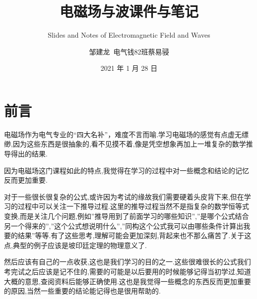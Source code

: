 \documentclass[
  10pt,
  twoside,
  openany,
  b5paper, %
  colorscheme = basic, %
]{qyxf-book}
\title{电磁场与波课件与笔记}
\subtitle{Slides and Notes of Electromagnetic Field and Waves}  %
\author{邹建龙\ 电气钱82班蔡易骎}
\date{2021 年 1 月 28 日}
\begin{document}
\maketitle

\chapter*{前言}
\thispagestyle{empty}

电磁场作为电气专业的“四大名补”，难度不言而喻.学习电磁场的感觉有点虚无缥缈,因为这些东西是很抽象的,看不见摸不着,像是凭空想象再加上一堆复杂的数学推导得出的结果.

因为电磁场这门课程如此的特点,我觉得在学习的过程中对一些概念和结论的记忆反而更加重要.

对于一些很长很复杂的公式,或许因为考试的缘故我们需要硬着头皮背下来,但在学习的过程中可以关注一下推导过程.这里的推导过程当然不是指复杂的数学恒等式变换,而是关注几个问题,例如”推导用到了前面学习的哪些知识”,”是哪个公式结合另一个得来的”,”这个公式想说明什么”,”同构这个公式我可以由哪些条件计算出我要的结果”等等.有了这些思考,理解可能会更加深刻,背起来也不那么痛苦了.关于这点,典型的例子应该是坡印廷定理的物理意义了.

然后应该有自己的一点收获,这也是我们学习的目的之一.这些很难很长的公式我们考完试之后应该是记不住的,需要的可能是以后要用的时候能够记得当初学过,知道大概的意思,查阅资料后能够正确使用.这也是我觉得一些概念的东西反而更加重要的原因,当然一些重要的结论能记得也是很用帮助的.


\newpage
\tableofcontents
\end{document}
